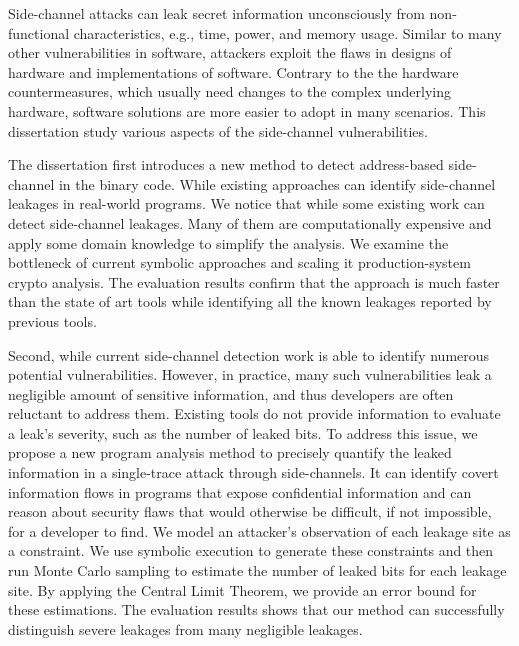 
\vspace{-0.3in}
Side-channel attacks can leak secret information unconsciously from non-functional characteristics, e.g., time, power, and memory usage. Similar to many other vulnerabilities in software, attackers exploit the flaws in designs of hardware and implementations of software. Contrary to the the hardware countermeasures, which usually need changes to the complex underlying hardware, software solutions are more easier to adopt in many scenarios. This dissertation study various aspects of the side-channel vulnerabilities.

The dissertation first introduces a new method to detect address-based side-channel in the binary code. While existing approaches can identify side-channel leakages in real-world programs. We notice that while some existing work can detect side-channel leakages. Many of them are computationally expensive and apply some domain knowledge to simplify the analysis.  We examine the bottleneck of current symbolic approaches and scaling it production-system crypto analysis. The evaluation results confirm that the approach is much faster than the state of art tools while identifying all the known leakages reported by previous tools.

Second, while current side-channel detection work is able to identify numerous potential vulnerabilities. However, in practice, many such vulnerabilities leak a negligible amount of sensitive information, and thus developers are often reluctant to address them. Existing tools do not provide information to evaluate a leak’s severity, such as the number of leaked bits. To address this issue, we propose a new program analysis method to precisely quantify the leaked information in a single-trace attack through side-channels. It can identify covert information flows in programs that expose confidential information and can reason about security flaws that would otherwise be difficult, if not impossible, for a developer to find. We model an attacker’s observation of each leakage site as a constraint. We use symbolic execution to generate these constraints and then run Monte Carlo sampling to estimate the number of leaked bits for each leakage site. By applying the Central Limit Theorem, we provide an error bound for these estimations. The evaluation results shows that our method can successfully distinguish severe leakages from many negligible leakages.

